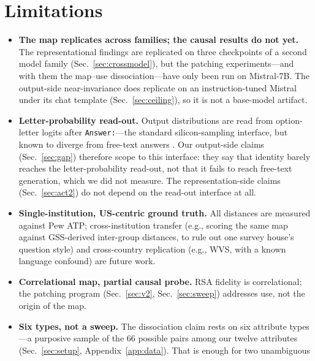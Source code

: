 \section{Limitations}
\label{sec:limitations}

\begin{itemize}
  \item \textbf{The map replicates across families; the causal results
        do not yet.} The representational findings are replicated on
        three checkpoints of a second model family
        (Sec.~\ref{sec:crossmodel}), but the patching experiments---and
        with them the map--use dissociation---have only been run on
        Mistral-7B. The output-side near-invariance does replicate on an
        instruction-tuned Mistral under its chat template
        (Sec.~\ref{sec:ceiling}), so it is not a base-model artifact.
  \item \textbf{Letter-probability read-out.} Output distributions are
        read from option-letter logits after \texttt{Answer:}---the
        standard silicon-sampling interface, but known to diverge from
        free-text answers \citep{myanswerisc2024}. Our output-side claims
        (Sec.~\ref{sec:gap}) therefore scope to this interface: they say
        that identity barely reaches the letter-probability read-out, not
        that it fails to reach free-text generation, which we did not
        measure. The representation-side claims (Sec.~\ref{sec:act2}) do
        not depend on the read-out interface at all.
  \item \textbf{Single-institution, US-centric ground truth.} All
        distances are measured against Pew ATP; cross-institution
        transfer (e.g., scoring the same map against GSS-derived
        inter-group distances, to rule out one survey house's question
        style) and cross-country replication (e.g., WVS, with a known
        language confound) are future work.
  \item \textbf{Correlational map, partial causal probe.} RSA fidelity is
        correlational; the patching program (Sec.~\ref{sec:v2},
        Sec.~\ref{sec:sweep}) addresses use, not the origin of the map.
  \item \textbf{Six types, not a sweep.} The dissociation claim rests on
        six attribute types---a purposive sample of the 66 possible pairs
        among our twelve attributes (Sec.~\ref{sec:setup},
        Appendix~\ref{app:data}). That is enough for two unambiguous

\end{itemize}
